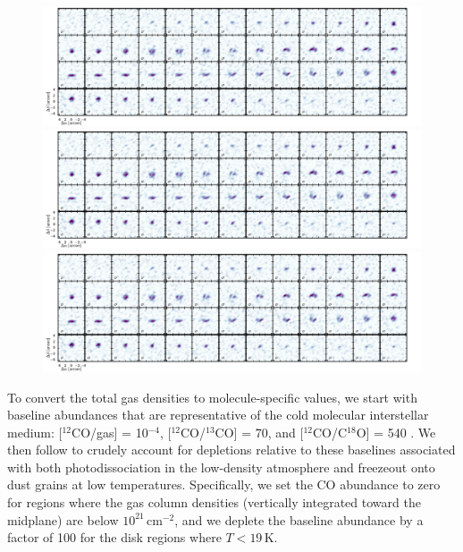 \documentclass[twocolumn]{aastex61}
\begin{document}
\begin{figure}[ht!]
\begin{center}
  \includegraphics[width=\linewidth]{chanmaps_c18o.pdf}
  \includegraphics[width=\linewidth]{chanmaps_c18o.pdf}
  \includegraphics[width=\linewidth]{chanmaps_c18o.pdf}
  \end{center}
\end{figure}


To convert the total gas densities to molecule-specific values, we start with baseline abundances that are representative of the cold molecular interstellar medium: [$^{12}$CO/gas] = 10$^{-4}$, [$^{12}$CO/$^{13}$CO] = 70, and [$^{12}$CO/C$^{18}$O] = 540 \citep[e.g.,][]{henkel94,prantzos96}.  We then follow \citet{qi08} to crudely account for depletions relative to these baselines associated with both photodissociation in the low-density atmosphere and freezeout onto dust grains at low temperatures.  Specifically, we set the CO abundance to zero for regions where the gas column densities (vertically integrated toward the midplane) are below $10^{21}$\,cm$^{-2}$, and we deplete the baseline abundance by a factor of 100 for the disk regions where $T<19$\,K.
\end{document}
